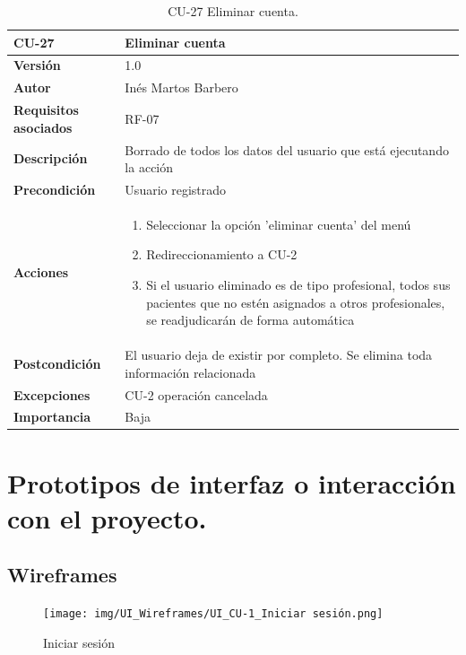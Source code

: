\begin{table}[p]
	\centering
	\begin{tabularx}{\linewidth}{ p{} p{} }
		\toprule
		\textbf{CU-27}    & \textbf{Eliminar cuenta}\\
		\toprule
		\textbf{Versión}              & 1.0    \\
		\textbf{Autor}                & Inés Martos Barbero \\
		\textbf{Requisitos asociados} & RF-07 \\
		\textbf{Descripción}          & Borrado de todos los datos del usuario que está ejecutando la acción \\
		\textbf{Precondición}         & Usuario registrado \\
		\textbf{Acciones}             &
		\begin{enumerate}
			\def\labelenumi{\arabic{enumi}.}
			\tightlist
			\item Seleccionar la opción 'eliminar cuenta' del menú
            \item Redireccionamiento a CU-2 
			\item Si el usuario eliminado es de tipo profesional, todos sus pacientes que no estén asignados a otros profesionales, se readjudicarán de forma automática
		\end{enumerate}\\
		\textbf{Postcondición}        & El usuario deja de existir por completo. Se elimina toda información relacionada \\
		\textbf{Excepciones}          & CU-2 operación cancelada \\
		\textbf{Importancia}          & Baja \\
		\bottomrule
	\end{tabularx}
	\caption{CU-27 Eliminar cuenta.}
\end{table}




\section{Prototipos de interfaz o interacción con el proyecto.}

\subsection{Wireframes}

\begin{figure}[h]
    \centering
    \texttt{[image: img/UI\_Wireframes/UI\_CU-1\_Iniciar sesión.png]}
    \caption{Iniciar sesión}
    \label{fig:Iniciar sesión}
\end{figure}


